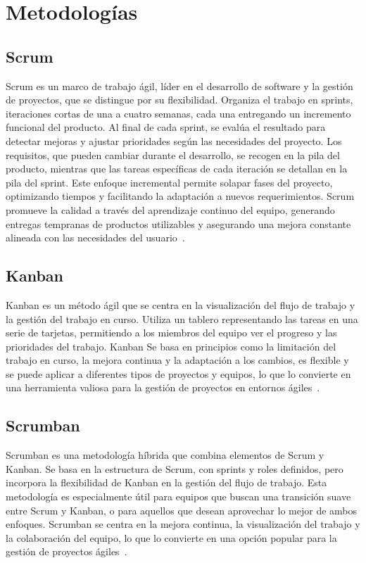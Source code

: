 
\section{Metodologías}

\subsection{Scrum}

Scrum es un marco de trabajo ágil, líder en el desarrollo de software y la gestión de proyectos, 
que se distingue por su flexibilidad. Organiza el trabajo en sprints, iteraciones cortas de una a cuatro 
semanas, cada una entregando un incremento funcional del producto. 
Al final de cada sprint, se evalúa el resultado para detectar mejoras 
y ajustar prioridades según las necesidades del proyecto. Los requisitos, que pueden cambiar durante el 
desarrollo, se recogen en la pila del producto, mientras que las tareas específicas de cada iteración se 
detallan en la pila del sprint. Este enfoque incremental permite solapar fases del proyecto, optimizando 
tiempos y facilitando la adaptación a nuevos requerimientos. Scrum promueve la calidad a través del
aprendizaje continuo del equipo, generando entregas tempranas de productos utilizables y asegurando una 
mejora constante alineada con las necesidades del usuario~\cite{wiki:Scrum}.

\subsection{Kanban}
Kanban es un método ágil que se centra en la visualización del flujo de trabajo y la gestión del
trabajo en curso. Utiliza un tablero representando las tareas en una serie de tarjetas, permitiendo a los
miembros del equipo ver el progreso y las prioridades del trabajo.
Kanban Se basa en principios como la limitación del trabajo en curso, la mejora continua y la
adaptación a los cambios, es flexible y se puede aplicar a diferentes tipos de proyectos y equipos,
lo que lo convierte en una herramienta valiosa para la gestión de proyectos en entornos ágiles~\cite{wiki:Kanban}.

\subsection{Scrumban}
Scrumban es una metodología híbrida que combina elementos de Scrum y Kanban.
Se basa en la estructura de Scrum, con sprints y roles definidos, pero incorpora la flexibilidad de Kanban
en la gestión del flujo de trabajo.
Esta metodología es especialmente útil para equipos que buscan una transición suave entre Scrum y Kanban,
o para aquellos que desean aprovechar lo mejor de ambos enfoques.
Scrumban se centra en la mejora continua, la visualización del trabajo y la colaboración del equipo,
lo que lo convierte en una opción popular para la gestión de proyectos ágiles~\cite{web:scrumban}.
